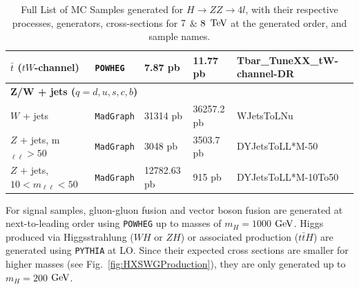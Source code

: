 \begin{table}[htbp]
\begin{center}
\begin{tabular}{lllll}
\small   $\bar{t}$ ($tW$-channel)   	& \small{\tt POWHEG} 		& \small 7.87 pb 	& \small 11.77 pb				& \small{\small Tbar\_TuneXX\_tW-channel-DR} \\ 
\hline %
          \multicolumn{5}{l}{\bf{Z/W + jets ($q=d,u,s,c,b$)}} \\     
\small   $W$ + jets     			& \small{\tt MadGraph}		& \small 31314 pb         & \small 36257.2 pb			& \small{\small WJetsToLNu} \\
\small   $Z$ + jets, m$_{\ell\ell}>50$     		& \small{\tt MadGraph}		& \small 3048 pb           & \small 3503.7 pb			& \small{\small DYJetsToLL*M-50} \\ 
\small   $Z$ + jets, $10<m_{\ell\ell}<50$     	& \small{\tt MadGraph}		& \small 12782.63 pb    & \small 915   pb			& \small{\small DYJetsToLL*M-10To50} \\ 
\hline %
   \end{tabular}
\caption[MC Samples for $H\rightarrow ZZ\rightarrow 4l$]{Full List of MC Samples generated for $H\rightarrow ZZ\rightarrow 4l$, with their respective processes, generators, cross-sections for $\rm{7}$ $\&$ $\rm{8}$ $\rm{TeV}$ at the generated order, and sample names.}
  \label{tbl:MCSamples}
  \end{center}
\end{table}

For signal samples, gluon-gluon fusion and vector boson fusion are generated at next-to-leading order using {\tt POWHEG} \cite{powheg} up to masses of $m_H = 1000$ $\rm{GeV}$. Higgs produced via Higgsstrahlung ($WH$ or $ZH$) or associated production ($t\bar{t}H$) are generated using {\tt PYTHIA} \cite{Sjostrand:2006za} at LO. Since their expected cross sections are smaller for higher masses (see Fig.~\ref{fig:HXSWGProduction}), they are only generated up to $m_H=200$ $\rm{GeV}$.

